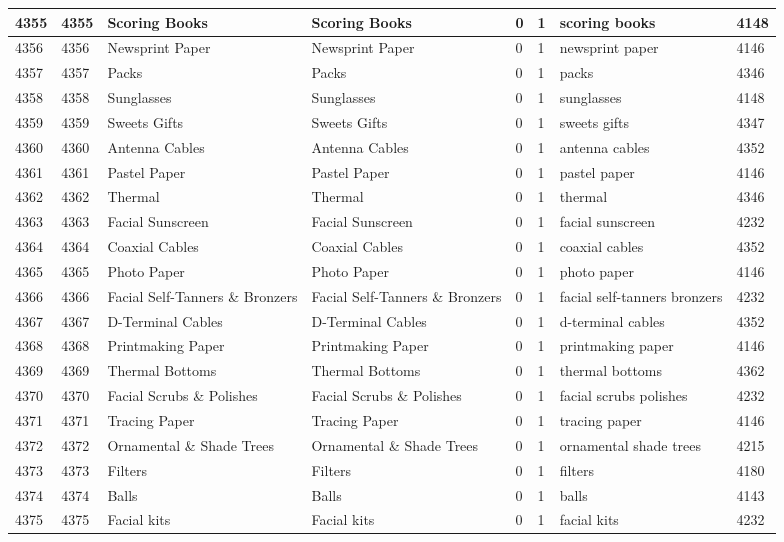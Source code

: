 \begin{longtable}{|l|l|l|l|l|l|l|l|}
4355 & 4355 & Scoring Books & Scoring Books & 0 & 1 & scoring books & 4148 \\ \hline 
4356 & 4356 & Newsprint Paper & Newsprint Paper & 0 & 1 & newsprint paper & 4146 \\ \hline 
4357 & 4357 & Packs & Packs & 0 & 1 & packs & 4346 \\ \hline 
4358 & 4358 & Sunglasses & Sunglasses & 0 & 1 & sunglasses & 4148 \\ \hline 
4359 & 4359 & Sweets Gifts & Sweets Gifts & 0 & 1 & sweets gifts & 4347 \\ \hline 
4360 & 4360 & Antenna Cables & Antenna Cables & 0 & 1 & antenna cables & 4352 \\ \hline 
4361 & 4361 & Pastel Paper & Pastel Paper & 0 & 1 & pastel paper & 4146 \\ \hline 
4362 & 4362 & Thermal & Thermal & 0 & 1 & thermal & 4346 \\ \hline 
4363 & 4363 & Facial Sunscreen & Facial Sunscreen & 0 & 1 & facial sunscreen & 4232 \\ \hline 
4364 & 4364 & Coaxial Cables & Coaxial Cables & 0 & 1 & coaxial cables & 4352 \\ \hline 
4365 & 4365 & Photo Paper & Photo Paper & 0 & 1 & photo paper & 4146 \\ \hline 
4366 & 4366 & Facial Self-Tanners \& Bronzers & Facial Self-Tanners \& Bronzers & 0 & 1 & facial self-tanners bronzers & 4232 \\ \hline 
4367 & 4367 & D-Terminal Cables & D-Terminal Cables & 0 & 1 & d-terminal cables & 4352 \\ \hline 
4368 & 4368 & Printmaking Paper & Printmaking Paper & 0 & 1 & printmaking paper & 4146 \\ \hline 
4369 & 4369 & Thermal Bottoms & Thermal Bottoms & 0 & 1 & thermal bottoms & 4362 \\ \hline 
4370 & 4370 & Facial Scrubs \& Polishes & Facial Scrubs \& Polishes & 0 & 1 & facial scrubs polishes & 4232 \\ \hline 
4371 & 4371 & Tracing Paper & Tracing Paper & 0 & 1 & tracing paper & 4146 \\ \hline 
4372 & 4372 & Ornamental \& Shade Trees & Ornamental \& Shade Trees & 0 & 1 & ornamental shade trees & 4215 \\ \hline 
4373 & 4373 & Filters & Filters & 0 & 1 & filters & 4180 \\ \hline 
4374 & 4374 & Balls & Balls & 0 & 1 & balls & 4143 \\ \hline 
4375 & 4375 & Facial kits & Facial kits & 0 & 1 & facial kits & 4232 \\ \hline 

\end{longtable}
